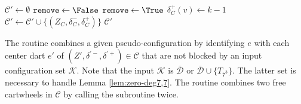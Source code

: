 \documentclass[main.tex]{subfiles}
\begin{document}
\begin{algorithm}[H]
    \caption{\deleteDegreeFromKToNWithLink($\mathcal{C}, k$)}
    \label{alg:delete_degree_k}
    \begin{algorithmic}[1]
        \State $\mathcal{C}' \gets \emptyset$
            \State $\texttt{remove} \gets \False$
                    \State $\texttt{remove} \gets \True$
                    \Break
                    \State $\delta_C^+(v) \gets k-1$
                \EndIf
            \EndFor
                \State $\mathcal{C}' \gets \mathcal{C}' \cup \{(Z_C, \delta_C^-, \delta_C^+)\}$
            \EndIf
        \EndFor
        \State \Return $\mathcal{C}'$
    \end{algorithmic}
\end{algorithm}

The \combineEachCartwheel routine combines a given pseudo-configuration by identifying $e$ with each center dart $e'$ of $(Z', \delta^{\prime-}, \delta^{\prime+}) \in \mathcal{C}$ that are not blocked by an input configuration set $\mathcal{K}$.
Note that the input $\mathcal{K}$ is $\bar{\mathcal{D}}$ or $\bar{\mathcal{D}} \cup \{T_{7^3}\}$.
The latter set is necessary to handle Lemma \ref{lem:zero-deg7,7}.
The \combineEachCartwheelTwice routine combines two free cartwheels in $\mathcal{C}$ by calling the \combineEachCartwheel subroutine twice.
\end{document}
